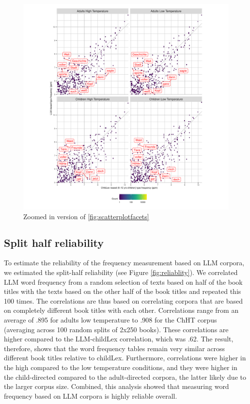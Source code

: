 \documentclass[doc, a4paper, anonymous]{apa7}
\begin{document}
\begin{figure}[!htbp]
    \includegraphics[width = 0.8\paperwidth]{figures/scatterplotfacetszoom.pdf}
    \caption{Zoomed in version of \ref{fig:scatterplotfacets}}
    \label{fig:scatterplotfacetszoom}
\end{figure}

\clearpage


\subsection{Split half reliability}

To estimate the reliability of the frequency measurement based on LLM corpora, we estimated the split-half reliability (see Figure \ref{fig:reliablity}). We correlated LLM word frequency from a random selection of texts based on half of the book titles with the texts based on the other half of the book titles and repeated this 100 times. The correlations are thus based on correlating corpora that are based on completely different book titles with each other. Correlations range from an average of .895 for adults low temperature to .908 for the ChHT corpus (averaging across 100 random splits of 2x250 books). These correlations are higher compared to the LLM-childLex correlation, which was .62. The result, therefore, shows that the word frequency tables remain very similar across different book titles relative to childLex. Furthermore, correlations were higher in the high compared to the low temperature conditions, and they were higher in the child-directed compared to the adult-directed corpora, the latter likely due to the larger corpus size. Combined, this analysis showed that measuring word frequency based on LLM corpora is highly reliable overall.
\end{document}
